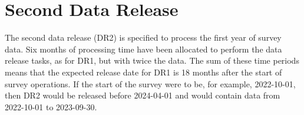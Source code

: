 \section{Second  Data Release } \label{sect:dr2}

The second data release (DR2) is specified to process the first year of survey data.
Six months of processing time have been allocated to perform the data release tasks, as for DR1, but with twice the data. 
The sum of these time periods means that the expected release date for DR1 is 18 months after the start of survey operations.       
If the start of the survey were to be, for example, 2022-10-01, then DR2 would be released before 2024-04-01 and would contain data from 2022-10-01 to 2023-09-30.
